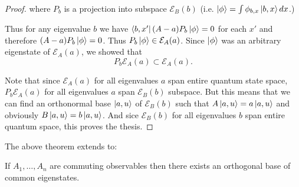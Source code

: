 \documentclass[main.tex]{subfiles}
\begin{document}
\begin{proof}
where $P_b$ is a projection into subspace $\mathcal{E}_B(b)$ (i.e.  $\ket{\phi} = \int \phi_{b, x} \ket{b, x}dx$.)

Thus for any eigenvalue $b$ we have $\bra{b, x'} (A - a)P_b \ket{\phi} = 0$ for each $x'$ and therefore $(A - a)P_b \ket{\phi} = 0$. Thus $P_b \ket{\phi}\in \mathcal{E}_A(a)$.
Since $\ket{\phi}$ was an arbitrary eigenstate of $\mathcal{E}_A(a)$, we showed that
\begin{equation}
P_b \mathcal{E}_A(a) \subset \mathcal{E}_A(a). 
\end{equation} 

Note that since $\mathcal{E}_A(a)$ for all eigenvalues $a$ span entire quantum state space, $P_b \mathcal{E}_A(a)$ for all eigenvalues $a$ span $\mathcal{E}_B(b)$ subspace. But this means that we can find an orthonormal base $\ket{a,u}$ of $\mathcal{E}_B(b)$ such that $A \ket{a,u} = a \ket{a,u}$ and obviously $B \ket{a,u} = b \ket{a,u}$. And sice $\mathcal{E}_B(b)$ for all eigenvalues $b$ span entire quantum space, this proves the thesis.

\end{proof}

The above theorem extends to: 

\begin{theorem}
If $A_1, \dots, A_n$ are commuting observables then there exists an orthogonal base of common eigenstates.
\end{theorem}
  
\end{document}
